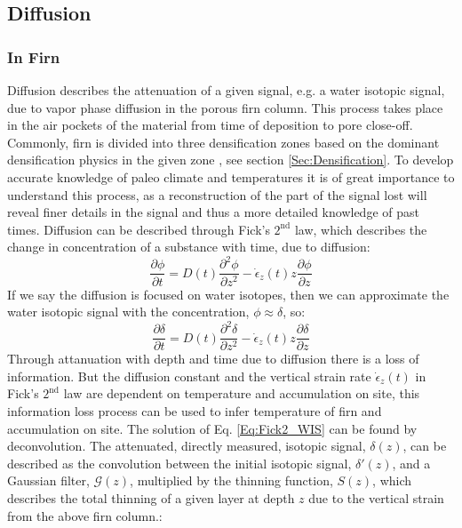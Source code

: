 \documentclass[../../CompleteThesis2/Complete_2ndDraft]{subfiles}
\begin{document}
\subsection[Diffusion]{Diffusion}
\label{Subsec:Ice_DiffusionAndDensification_Diffusion}

\subsubsection{In Firn}
\label{Subsubsec:Ice_DiffusionAndDensification_Diffusion_Firn}
Diffusion describes the attenuation of a given signal, e.g. a water isotopic signal, due to vapor phase diffusion in the porous firn column. This process takes place in the air pockets of the material from time of deposition to pore close-off. Commonly, firn is divided into three densification zones based on the dominant densification physics in the given zone \cite[Herron and Langway, 1980]{HerronLangway1980}, see section \ref{Sec:Densification}.
To develop accurate knowledge of paleo climate and temperatures it is of great importance to understand this process, as a reconstruction of the part of the signal lost will reveal finer details in the signal and thus a more detailed knowledge of past times. 
Diffusion can be described through Fick's $2^{\text{nd}}$ law, which describes the change in concentration of a substance with time, due to diffusion:
\begin{equation}
	\frac{\partial \phi}{\partial t} = D(t) \frac{\partial^2 \phi}{\partial z^2} - \dot{\epsilon}_z(t) z \frac{\partial \phi}{\partial z}
	\label{Eq:Fick2_concentration}
\end{equation}
If we say the diffusion is focused on water isotopes, then we can approximate the water isotopic signal with the concentration, $\phi \approx \delta$, so:
\begin{equation}
	\frac{\partial \delta}{\partial t} = D(t) \frac{\partial^2 \delta}{\partial z^2} - \dot{\epsilon}_z(t) z \frac{\partial \delta}{\partial z}
	\label{Eq:Fick2_WIS}
\end{equation}
Through attanuation with depth and time due to diffusion there is a loss of information. But the diffusion constant and the vertical strain rate $\dot{\epsilon}_z(t)$ in Fick's $2^{\text{nd}}$ law are dependent on temperature and accumulation on site, this information loss process can be used to infer temperature of firn and accumulation on site. 
The solution of Eq. \ref{Eq:Fick2_WIS} can be found by deconvolution. The attenuated, directly measured, isotopic signal, $\delta(z)$, can be described as the convolution between the initial isotopic signal, $\delta '(z)$, and a Gaussian filter, $\mathcal{G}(z)$, multiplied by the thinning function, $S(z)$, which describes the total thinning of a given layer at depth $z$ due to the vertical strain from the above firn column.:
\end{document}
